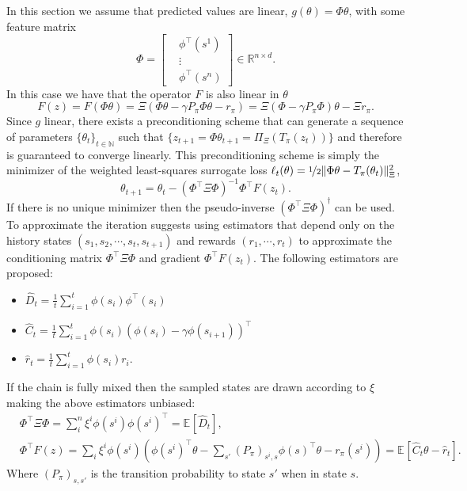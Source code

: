 \documentclass{article} %
\theoremstyle{definition}
\newcommand{\reals}{\mathbb{R}}
\newcommand{\nnumbers}{\mathbb{N}}
\newcommand{\expect}[2][]{\mathbb{E}_{#1}\left[ #2\right]}
\begin{document}
In this section we assume that predicted values are linear, $g(\theta) = \Phi \theta$, with some feature matrix
\[
    \Phi = \begin{bmatrix}
             &\phi^\top(s^1) \\
             &\vdots \\
             & \phi^\top(s^n)
            \end{bmatrix} \in \reals^{n \times d}.
\]
In this case we have that the operator $F$ is also linear in $\theta$
\[
    F(z) = F(\Phi \theta) = \Xi(\Phi \theta - \gamma P_\pi \Phi \theta  - r_\pi) = \Xi(\Phi - \gamma P_\pi \Phi) \theta  - \Xi r_\pi. 
\]
Since $g$ linear, there exists a preconditioning scheme that can generate a sequence of parameters $\{\theta_t\}_{t\in\nnumbers}$ such that $\{z_{t+1} = \Phi \theta_{t+1} =\Pi_{\Xi}(T_\pi(z_t)) \}$ and therefore is guaranteed to converge linearly.
This preconditioning scheme is simply the minimizer of the weighted least-squares surrogate loss $\ell_t(\theta)=\nicefrac{1}{2}\|\Phi \theta -T_{\pi}(\theta_t)\|^2_{\Xi}$,
\[
    \theta_{t+1} = \theta_t - (\Phi^\top \Xi \Phi)^{-1} \Phi^\top F(z_t). 
\]
If there is no unique minimizer then the pseudo-inverse $(\Phi^\top \Xi \Phi)^{\dag}$ can be used.
To approximate the iteration \citet{bertsekas2009projected} suggests using estimators that depend only on the history states $(s_1, s_2, \cdots,s_t, s_{t+1})$ and rewards $(r_1, \cdots, r_t)$ to approximate the conditioning matrix $\Phi^\top \Xi \Phi$ and gradient $\Phi^\top F(z_t)$.
The following estimators are proposed:
\begin{itemize}
    \item $\hat{D}_t = \frac{1}{t}\sum_{i=1}^t \phi(s_i)\phi^\top(s_i)$
    \item $\hat{C}_t = \frac{1}{t}\sum_{i=1}^t \phi(s_i)(\phi(s_i) - \gamma \phi(s_{i+1}))^\top$
    \item $\hat{r}_t=\frac{1}{t}\sum_{i=1}^t \phi(s_i)r_i$.
\end{itemize}
If the chain is fully mixed then the sampled states are drawn according to $\xi$ making the above estimators unbiased: 
\begin{align*}
    &\Phi^\top \Xi \Phi = \sum_i^n \xi^i \phi(s^i)\phi(s^i)^\top = \expect{\hat{D}_t},\\
    &\Phi^\top F(z) =  \sum_{i} \xi^i \phi(s^i)(\phi(s^i)^\top \theta  - \sum_{s'}(P_\pi)_{s^i,s} \phi(s)^\top \theta -r_{\pi}(s^i)) = \expect{\hat{C}_t \theta - \hat{r}_t}.
\end{align*}
Where $(P_\pi)_{s,s'}$ is the transition probability to state $s'$ when in state $s$.
\end{document}
